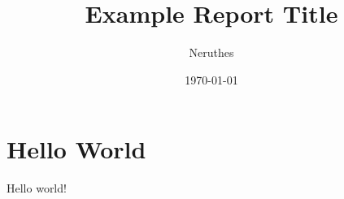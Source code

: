 \documentclass[12pt,a4paper]{report}
\title{Example Report Title}
\author{Neruthes}
\date{\today}
\begin{document}
\maketitlecover

\chapter{Hello World}

Hello world!

\lipsum[1-3][1-5]
\end{document}
